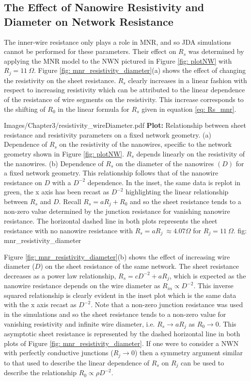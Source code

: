 \subsection{The Effect of Nanowire Resistivity and Diameter on Network Resistance}
The inner-wire resistance only plays a role in MNR, and so JDA simulations cannot be performed for these parameters. Their effect on $R_s$ was determined by applying the MNR model to the NWN pictured in Figure \ref{fig: plotNW} with $R_j =11 ~ \Omega$. Figure \ref{fig: mnr_resistivity_diameter}(a) shows the effect of changing the resistivity on the sheet resistance. $R_s$ clearly increases in a linear fashion with respect to increasing resistivity which can be attributed to the linear dependence of the resistance of wire segments on the resistivity. This increase corresponds to the shifting of $R_0$ in the linear formula for $R_s$ given in equation \ref{eq: Rs_mnr}. 

{Images/Chapter3/resistivity_wireDiameter.pdf}
{\textbf{Plot:} Relationship between sheet resistance and resistivity parameters on a fixed network geometry.}
{(a) Dependence of $R_s$ on the resistivity of the nanowires, specific to the network geometry shown in Figure \ref{fig: plotNW}. $R_s$ depends linearly on the resistivity of the nanowires. (b) Dependence of $R_s$ on the diameter of the nanowires $(D)$ for a fixed network geometry. This relationship follows that of the nanowire resistance on $D$ with a $D^{-2}$ dependence. In the inset, the same data is replot in green, the x axis has been recast as $D^{-2}$ highlighting the linear relationship between $R_s$ and $D$. Recall $R_s = a R_j + R_0$ and so the sheet resistance tends to a non-zero value determined by the junction resistance for vanishing nanowire resistance. The horizontal dashed line in both plots represents the sheet resistance with no nanowire resistance with $R_s = aR_j ~\approx 4.07 \Omega$ for $R_j = 11 ~ \Omega$.}
{fig: mnr_resistivity_diameter}

Figure \ref{fig: mnr_resistivity_diameter}(b) shows the effect of increasing wire diameter ($D$) on the sheet resistance of the same network. The sheet resistance decreases as a power law relationship, $R_s = c D^{-2} + aR_j$, which is expected as the nanowire resistance depends on the wire diameter as $R_{in} \propto D^{-2}$. This inverse squared relationship is clearly evident in the inset plot which is the same data with the x axis recast as $D^{-2}$. Note that a non-zero junction resistance was used in the simulations and so the sheet resistance tends to a non-zero value for vanishing resistivity and infinite wire diameter, i.e. $R_s \rightarrow a R_j$ as $R_0 \rightarrow 0$. This asymptotic sheet resistance is represented by the dashed horizontal line in both plots of Figure \ref{fig: mnr_resistivity_diameter}. If one were to consider a NWN with perfectly conductive junctions ($R_j \rightarrow 0$) then a symmetry argument similar to that used to describe the linear dependence of $R_s$ on $R_j$ can be used to describe the relationship $R_0 \propto \rho D^{-2}$. 

